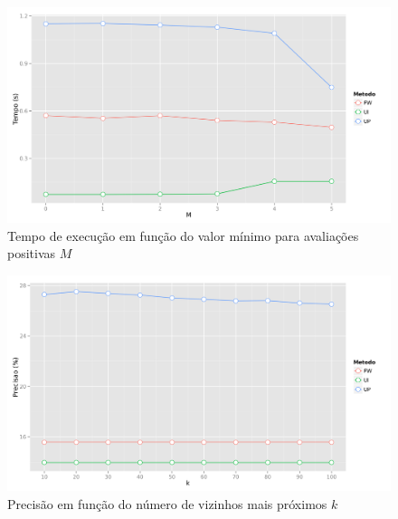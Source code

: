 {\begin{figure}[hp]
    \begin{center}
    \includegraphics[width=1\textwidth]{img/time_M}
    \end{center}
    \caption{Tempo de execução em função do valor mínimo para avaliações positivas $M$}
    \label{fig:time_M}
\end{figure}


\begin{figure}[hp]
    \begin{center}
    \includegraphics[width=1\textwidth]{img/precision_k}
    \end{center}
    \caption{Precisão em função do número de vizinhos mais próximos $k$}
    \label{fig:precision_k}
\end{figure}

}
